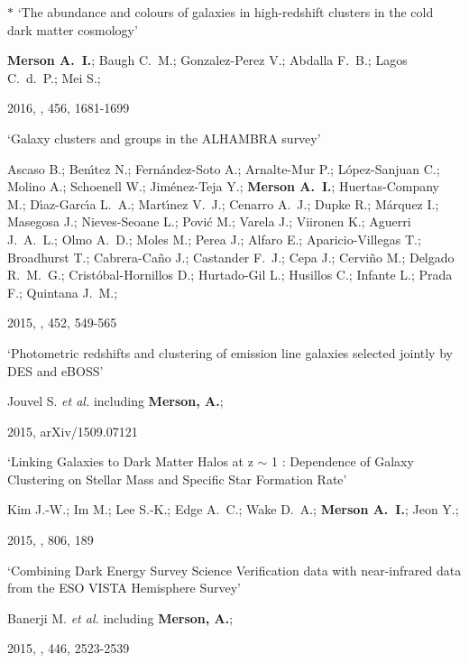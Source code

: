 \begin{etaremune}[leftmargin=15pt]
\item \label{itm:Merson2016}{\Large $\ast$} `The abundance and colours of galaxies in high-redshift clusters in the cold dark matter cosmology'\newline
  \begin{small}\textbf{Merson A.~I.}; Baugh C.~M.; Gonzalez-Perez V.; Abdalla F.~B.; Lagos C.~d.~P.; Mei S.;\end{small} 2016, \mnras, 456, 1681-1699

\item \label{itm:Ascaso2015} `Galaxy clusters and groups in the ALHAMBRA survey'\newline
  \begin{small}Ascaso B.; Ben{\'{\i}}tez N.; Fern{\'a}ndez-Soto A.; Arnalte-Mur P.; L{\'o}pez-Sanjuan C.; Molino A.; Schoenell W.; Jim{\'e}nez-Teja Y.; \textbf{Merson A.~I.}; Huertas-Company M.; D{\'{\i}}az-Garc{\'{\i}}a L.~A.; Mart{\'{\i}}nez V.~J.; Cenarro A.~J.; Dupke R.; M{\'a}rquez I.; Masegosa J.; Nieves-Seoane L.; Povi{\'c} M.; Varela J.; Viironen K.; Aguerri J.~A.~L.; Olmo A.~D.; Moles M.; Perea J.; Alfaro E.; Aparicio-Villegas T.; Broadhurst T.; Cabrera-Ca{\~n}o J.; Castander F.~J.; Cepa J.; Cervi{\~n}o M.; Delgado R.~M.~G.; Crist{\'o}bal-Hornillos D.; Hurtado-Gil L.; Husillos C.; Infante L.; Prada F.; Quintana J.~M.;\end{small} 2015, \mnras, 452, 549-565

\item \label{itm:Jouvel2015} `Photometric redshifts and clustering of emission line galaxies selected jointly by DES and eBOSS'\newline
  \begin{small}Jouvel S. \textit{et al.} including \textbf{Merson, A.};\end{small} 2015, arXiv/1509.07121

\item \label{itm:Kim2015} `Linking Galaxies to Dark Matter Halos at z $\sim$ 1 : Dependence of Galaxy Clustering on Stellar Mass and Specific Star Formation Rate'\newline
  \begin{small}Kim J.-W.; Im M.; Lee S.-K.; Edge A.~C.; Wake D.~A.; \textbf{Merson A.~I.}; Jeon Y.;\end{small} 2015, \apj, 806, 189

\item \label{itm:Banerji2015} `Combining Dark Energy Survey Science Verification data with near-infrared data from the ESO VISTA Hemisphere Survey'\newline
  \begin{small}Banerji M. \textit{et al.} including \textbf{Merson, A.};\end{small} 2015, \mnras, 446, 2523-2539


\end{etaremune}
